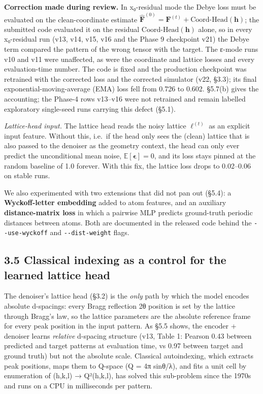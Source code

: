 \documentclass[
  11pt,
]{article}
\begin{document}
\textbf{Correction made during review.} In x₀-residual mode the Debye
loss must be evaluated on the clean-coordinate estimate
\(\hat{\mathbf{F}}^{(0)} = \mathbf{F}^{(t)} + \text{Coord-Head}(\mathbf{h})\);
the submitted code evaluated it on the residual
\(\text{Coord-Head}(\mathbf{h})\) alone, so in every x₀-residual run
(v13, v14, v15, v16 and the Phase 9 checkpoint v21) the Debye term
compared the pattern of the wrong tensor with the target. The ε-mode
runs v10 and v11 were unaffected, as were the coordinate and lattice
losses and every evaluation-time number. The code is fixed and the
production checkpoint was retrained with the corrected loss and the
corrected simulator (v22, §3.3); its final exponential-moving-average
(EMA) loss fell from 0.726 to 0.602. §5.7(b) gives the accounting; the
Phase-4 rows v13--v16 were not retrained and remain labelled exploratory
single-seed runs carrying this defect (§5.1).

\emph{Lattice-head input.} The lattice head reads the noisy lattice
\(\boldsymbol{\ell}^{(t)}\) as an explicit input feature. Without this,
i.e.~if the head only sees the (clean) lattice that is also passed to
the denoiser as the geometry context, the head can only ever predict the
unconditional mean noise, \(\mathbb{E}[\boldsymbol{\epsilon}] = 0\), and
its loss stays pinned at the random baseline of 1.0 forever. With this
fix, the lattice loss drops to 0.02--0.06 on stable runs.

We also experimented with two extensions that did not pan out (§5.4): a
\textbf{Wyckoff-letter embedding} added to atom features, and an
auxiliary \textbf{distance-matrix loss} in which a pairwise MLP predicts
ground-truth periodic distances between atoms. Both are documented in
the released code behind the \texttt{-\/-use-wyckoff} and
\texttt{-\/-dist-weight} flags.

\subsection{3.5 Classical indexing as a control for the learned lattice
head}\label{classical-indexing-as-a-control-for-the-learned-lattice-head}

The denoiser's lattice head (§3.2) is the \emph{only} path by which the
model encodes absolute d-spacings: every Bragg reflection 2θ position is
set by the lattice through Bragg's law, so the lattice parameters are
the absolute reference frame for every peak position in the input
pattern. As §5.5 shows, the encoder + denoiser learns \emph{relative}
d-spacing structure (v13, Table 1: Pearson 0.43 between predicted and
target patterns at evaluation time, vs 0.97 between target and ground
truth) but not the absolute scale. Classical autoindexing, which
extracts peak positions, maps them to Q-space (Q = 4π sinθ/λ), and fits
a unit cell by enumeration of (h,k,l) → Q²(h,k,l), has solved this
sub-problem since the 1970s and runs on a CPU in milliseconds per
pattern.
\end{document}

